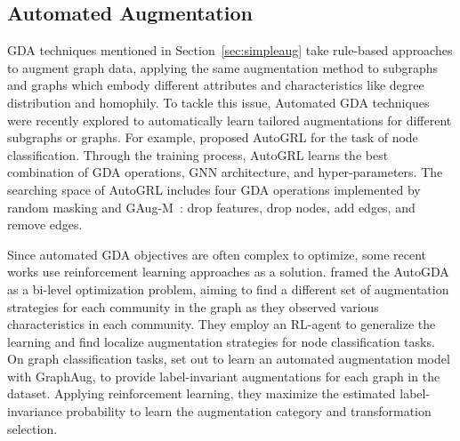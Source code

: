 \documentclass[11pt]{article}
\begin{document}
\subsection{Automated Augmentation}
\label{sec:autoaug}
GDA techniques mentioned in Section~\ref{sec:simpleaug} take rule-based approaches to augment graph data, applying the same augmentation method to subgraphs and graphs which embody different attributes and characteristics like degree distribution and homophily. To tackle this issue, Automated GDA techniques~\cite{sun2021automated, luo2022automated,zhao2022autogda,you2021graph, kose2022fair, hassani2022learning, zhu2021graph} were recently explored to automatically learn tailored augmentations for different subgraphs or graphs. For example, \citet{sun2021automated} proposed AutoGRL for the task of node classification. Through the training process, AutoGRL learns the best combination of GDA operations, GNN architecture, and hyper-parameters. The searching space of AutoGRL includes four GDA operations implemented by random masking and GAug-M~\cite{zhao2021data}: drop features, drop nodes, add edges, and remove edges.

Since automated GDA objectives are often complex to optimize, some recent works use reinforcement learning approaches as a solution. \citet{zhao2022autogda} framed the AutoGDA as a bi-level optimization problem, aiming to find a different set of augmentation strategies for each community in the graph as they observed various characteristics in each community. They employ an RL-agent to generalize the learning and find localize augmentation strategies for node classification tasks. On graph classification tasks, \citet{luo2022automated} set out to learn an automated augmentation model with GraphAug, to provide label-invariant augmentations for each graph in the dataset. Applying reinforcement learning, they maximize the estimated label-invariance probability to learn the augmentation category and transformation selection.
\end{document}
